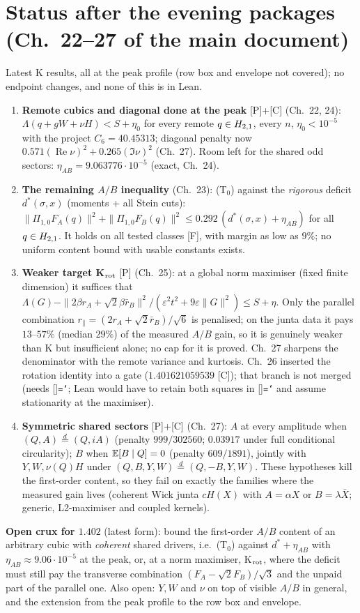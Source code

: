 \documentclass[11pt,a4paper]{article}
\renewcommand{\Re}{\operatorname{Re}}\newcommand{\Var}{\operatorname{Var}}\newcommand{\ph}{\operatorname{phase}}\newcommand{\st}[1]{\textsf{[#1]}}\newcommand{\brkus}{\textunderscore\allowbreak}\usepackage{xstring,adjustbox}\DeclareRobustCommand{\code}[1]{\begingroup\noexpandarg\StrSubstitute{#1}{/}{/\allowbreak}[\brktmp]\texttt{\let\_\brkus\hyphenchar\font=`\-\brktmp}\endgroup}\setlength{\emergencystretch}{3em}
\begin{document}
\section{Status after the evening packages (Ch.~22--27 of the main document)}\label{sec:latest}
Latest K results, all at the peak profile (row box and envelope not covered); no endpoint changes, and none of this is in Lean.
\begin{enumerate}
\item \textbf{Remote cubics and diagonal done at the peak} \st{P}+\st{C} (Ch.~22, 24): $\Lambda(q+gW+\nu H)<S+\eta_0$ for every remote $q\in H_{2,1}$, every $n$, $\eta_0<10^{-5}$ with the project
$C_6=40.45313$; diagonal penalty now $0.571(\Re\nu)^2+0.265(\Im\nu)^2$ (Ch.~27). Room left for the shared odd sectors: $\eta_{AB}=9.063776\cdot10^{-5}$ (exact, Ch.~24).
\item \textbf{The remaining $A/B$ inequality} (Ch.~23): (T$_0$) against the \emph{rigorous} deficit $d^*(\sigma,x)$ (moments + all Stein cuts):
$\|\Pi_{1,0}F_A(q)\|^2+\|\Pi_{1,0}F_B(q)\|^2\le0.292\,(d^*(\sigma,x)+\eta_{AB})$ for all $q\in H_{2,1}$. It holds on all tested classes \st{F}, with margin as low as $9\%$; no uniform
content bound with usable constants exists.
\item \textbf{Weaker target K$_{\rm rot}$} \st{P} (Ch.~25): at a global norm maximiser (fixed finite dimension) it suffices that
$\Lambda(G)-\|2\beta r_A+\sqrt2\beta\bar r_B\|^2/(\varepsilon^2t^2+9\varepsilon\|G\|^2)\le S+\eta$. Only the parallel combination $r_\parallel=(2r_A+\sqrt2\bar r_B)/\sqrt6$ is penalised; on the junta
data it pays $13$--$57\%$ (median $29\%$) of the measured $A/B$ gain, so it is genuinely weaker than K but insufficient alone; no cap for it is proved. Ch.~27 sharpens the denominator with the remote
variance and kurtosis. Ch.~26 inserted the rotation identity into a gate ($1.401621059539$ \st{C}); that branch is not merged (needs \code{RotShared}; Lean would have to retain both squares in
\code{RowReduction} and assume stationarity at the maximiser).
\item \textbf{Symmetric shared sectors} \st{P}+\st{C} (Ch.~27): $A$ at every amplitude when $(Q,A)\overset{d}=(Q,iA)$ (penalty $999/302560$; $0.03917$ under full conditional circularity); $B$ when
$\mathbb{E}[B\mid Q]=0$ (penalty $609/1891$), jointly with $Y,W,\nu(Q)H$ under $(Q,B,Y,W)\overset{d}=(Q,-B,Y,W)$. These hypotheses kill the first-order content, so they fail on exactly the families where
the measured gain lives (coherent Wick junta $cH(X)$ with $A=\alpha X$ or $B=\lambda\bar X$; generic, L2-maximiser and coupled kernels).
\end{enumerate}
\textbf{Open crux for $1.402$} (latest form): bound the first-order $A/B$ content of an arbitrary cubic with \emph{coherent} shared drivers, i.e.\ (T$_0$) against $d^*+\eta_{AB}$ with
$\eta_{AB}\approx9.06\cdot10^{-5}$ at the peak, or, at a norm maximiser, K$_{\rm rot}$, where the deficit must still pay the transverse combination $(F_A-\sqrt2F_B)/\sqrt3$ and the unpaid part of
the parallel one. Also open: $Y,W$ and $\nu$ on top of visible $A/B$ in general, and the extension from the peak profile to the row box and envelope.
\end{document}

